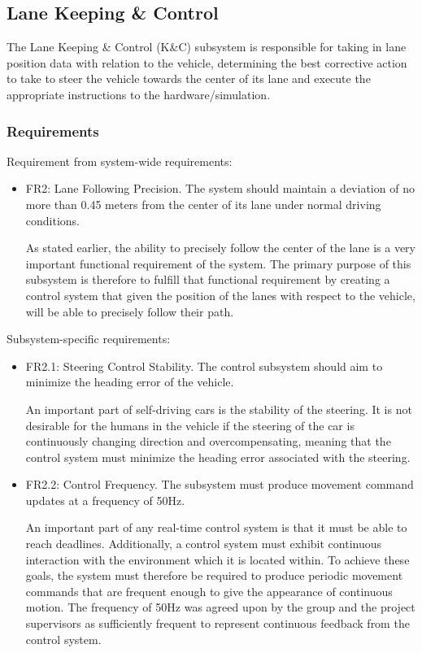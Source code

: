 \documentclass[titlepage,draft]{article}
\begin{document}
{\subsection{Lane Keeping \& Control}
The Lane Keeping \& Control (K\&C) subsystem is responsible for taking in lane position data with relation to the vehicle, determining the best corrective action to take to steer the vehicle towards the center of its lane and execute the appropriate instructions to the hardware/simulation.

\subsubsection{Requirements}
Requirement from system-wide requirements:

\begin{itemize}
	\item FR2: Lane Following Precision. The system should maintain a deviation of no more than 0.45 meters from the center of its lane under normal driving conditions.

	      As stated earlier, the ability to precisely follow the center of the lane is a very important functional requirement of the system. The primary purpose of this subsystem is therefore to fulfill that functional requirement by creating a control system that given the position of the lanes with respect to the vehicle, will be able to precisely follow their path.

\end{itemize}
Subsystem-specific requirements:
\begin{itemize}


	\item FR2.1: Steering Control Stability. The control subsystem should aim to minimize the heading error of the vehicle.

	      An important part of self-driving cars is the stability of the steering. It is not desirable for the humans in the vehicle if the steering of the car is continuously changing direction and overcompensating, meaning that the control system must minimize the heading error associated with the steering.

	\item FR2.2: Control Frequency.
	      The subsystem must produce movement command updates at a frequency of 50Hz.

	      An important part of any real-time control system is that it must be able to reach deadlines. Additionally, a control system must exhibit continuous interaction with the environment which it is located within. To achieve these goals, the system must therefore be required to produce periodic movement commands that are frequent enough to give the appearance of continuous motion. The frequency of 50Hz was agreed upon by the group and the project supervisors as sufficiently frequent to represent continuous feedback from the control system.


\end{itemize}}
\end{document}
